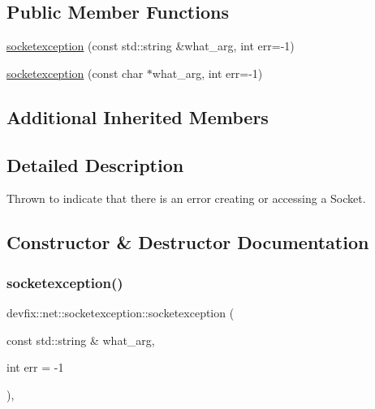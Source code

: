\subsection*{Public Member Functions}
\begin{DoxyCompactItemize}
\item 
\hyperlink{structdevfix_1_1net_1_1socketexception_aeab5d004d494103b37156a5f23a5296a}{socketexception} (const std\+::string \&what\+\_\+arg, int err=-\/1)
\item 
\hyperlink{structdevfix_1_1net_1_1socketexception_a6da69f635eb11f932a0e960545d023bd}{socketexception} (const char $\ast$what\+\_\+arg, int err=-\/1)
\end{DoxyCompactItemize}
\subsection*{Additional Inherited Members}


\subsection{Detailed Description}
Thrown to indicate that there is an error creating or accessing a Socket. 

\subsection{Constructor \& Destructor Documentation}
\mbox{\label{structdevfix_1_1net_1_1socketexception_aeab5d004d494103b37156a5f23a5296a}} 
\subsubsection{\texorpdfstring{socketexception()}{socketexception()}\hspace{0.1cm}{\footnotesize\ttfamily [1/2]}}
{\footnotesize\ttfamily devfix\+::net\+::socketexception\+::socketexception (\begin{DoxyParamCaption}\item[{const std\+::string \&}]{what\+\_\+arg,  }\item[{int}]{err = {\ttfamily -\/1} }\end{DoxyParamCaption})\hspace{0.3cm}{\ttfamily [inline]}, {\ttfamily [explicit]}}


